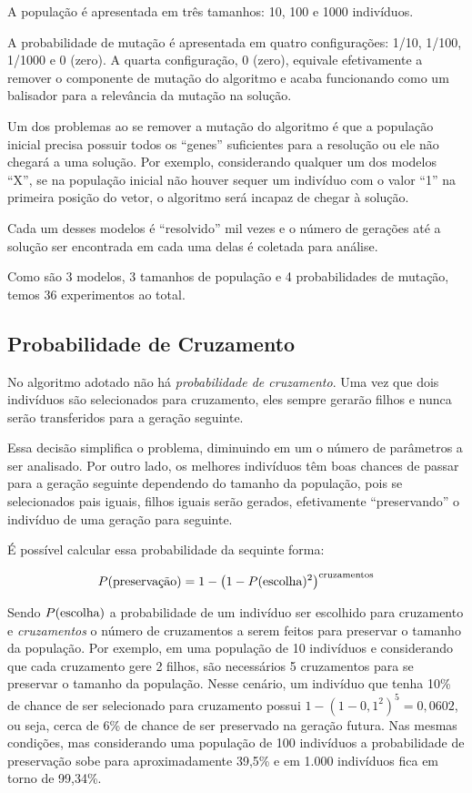 \documentclass{llncs}
\begin{document}
A população é apresentada em três tamanhos: 10, 100 e 1000 indivíduos.

A probabilidade de mutação é apresentada em quatro configurações: 1/10, 1/100, 1/1000 e 0 (zero). A quarta configuração, 0 (zero), equivale efetivamente a remover o componente de mutação do algoritmo e acaba funcionando como um balisador para a relevância da mutação na solução.

Um dos problemas ao se remover a mutação do algoritmo é que a população inicial precisa possuir todos os \enquote{genes} suficientes para a resolução ou ele não chegará a uma solução. Por exemplo, considerando qualquer um dos modelos \enquote{X}, se na população inicial não houver sequer um indivíduo com o valor \enquote{1} na primeira posição do vetor, o algoritmo será incapaz de chegar à solução.

Cada um desses modelos é \enquote{resolvido} mil vezes e o número de gerações até a solução ser encontrada em cada uma delas é coletada para análise.

Como são 3 modelos, 3 tamanhos de população e 4 probabilidades de mutação, temos 36 experimentos ao total.

%
\subsection{Probabilidade de Cruzamento}
%
No algoritmo adotado não há \emph{probabilidade de cruzamento}. Uma vez que dois indivíduos são selecionados para cruzamento, eles sempre gerarão filhos e nunca serão transferidos para a geração seguinte.

Essa decisão simplifica o problema, diminuindo em um o número de parâmetros a ser analisado. Por outro lado, os melhores indivíduos têm boas chances de passar para a geração seguinte dependendo do tamanho da população, pois se selecionados pais iguais, filhos iguais serão gerados, efetivamente \enquote{preservando} o indivíduo de uma geração para seguinte.

É possível calcular essa probabilidade da sequinte forma:

\begin{align*}
P(\textnormal{preservação}) = 1 - \left(1 - P(\textnormal{escolha})^2\right)^{\textnormal{cruzamentos}}
\end{align*}

Sendo $P(\textnormal{escolha})$ a probabilidade de um indivíduo ser escolhido para cruzamento e \emph{cruzamentos} o número de cruzamentos a serem feitos para preservar o tamanho da população. Por exemplo, em uma população de 10 indivíduos e considerando que cada cruzamento gere 2 filhos, são necessários 5 cruzamentos para se preservar o tamanho da população. Nesse cenário, um indivíduo que tenha 10\% de chance de ser selecionado para cruzamento possui $1 - \left(1 - 0,1^2\right)^5 = 0,0602$, ou seja, cerca de 6\% de chance de ser preservado na geração futura. Nas mesmas condições, mas considerando uma população de 100 indivíduos a probabilidade de preservação sobe para aproximadamente 39,5\% e em 1.000 indivíduos fica em torno de 99,34\%.
%
\end{document}
